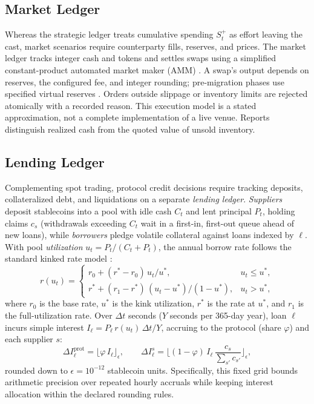 \subsection{Market Ledger}\label{sec:market}
Whereas the strategic ledger treats cumulative spending $S_t^{+}$ as effort leaving the cast,
market scenarios require counterparty fills, reserves, and prices. The market
ledger tracks integer cash and tokens and settles swaps using a simplified
constant-product automated market maker (AMM) \cite{angeris2021,xu2023amm}.
A swap's output depends on reserves, the configured fee, and integer rounding;
pre-migration phases use specified virtual reserves \cite{pumpdocs}.
Orders outside slippage or inventory limits are rejected atomically with a
recorded reason. This execution model is a stated approximation, not a complete
implementation of a live venue. Reports distinguish realized cash from the
quoted value of unsold inventory.

\subsection{Lending Ledger}\label{sec:lending}
Complementing spot trading, protocol credit decisions require tracking
deposits, collateralized debt, and liquidations on a separate \textit{lending
ledger}. \textit{Suppliers} deposit stablecoins into a pool with idle cash
$C_t$ and lent principal $P_t$, holding claims $c_s$ (withdrawals exceeding
$C_t$ wait in a first-in, first-out queue ahead of new loans), while
\textit{borrowers} pledge volatile collateral against loans indexed by $\ell$.
With pool \textit{utilization} $u_t=P_t/(C_t+P_t)$, the annual borrow rate
follows the standard kinked rate model \cite{gudgeon2020}:
\begin{equation}
r(u_t)=\begin{cases}
r_0+(r^\ast-r_0)\,u_t/u^\ast, & u_t\le u^\ast,\\
r^\ast+(r_1-r^\ast)\,(u_t-u^\ast)/(1-u^\ast), & u_t>u^\ast,
\end{cases}
\label{eq:rate}
\end{equation}
where $r_0$ is the base rate, $u^\ast$ is the kink utilization, $r^\ast$ is
the rate at $u^\ast$, and $r_1$ is the full-utilization rate. Over $\Delta t$
seconds ($Y$ seconds per 365-day year), loan $\ell$ incurs simple interest
$I_\ell=P_\ell\,r(u_t)\,\Delta t/Y$, accruing to the protocol (share $\varphi$)
and each supplier $s$:
\begin{equation}
\Delta I^{\mathrm{prot}}_\ell=\big\lfloor \varphi\, I_\ell\big\rfloor_{\epsilon},\qquad
\Delta I^{s}_\ell=\Big\lfloor (1-\varphi)\, I_\ell\,\frac{c_s}{\sum_{s'}c_{s'}}\Big\rfloor_{\epsilon},
\label{eq:accrual}
\end{equation}
rounded down to $\epsilon=10^{-12}$ stablecoin units. Specifically, this
fixed grid bounds arithmetic precision over repeated hourly accruals while
keeping interest allocation within the declared rounding rules.

